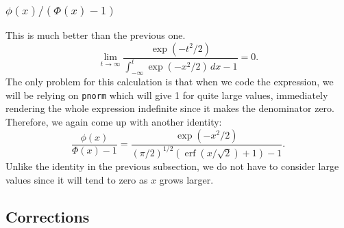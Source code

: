 \documentclass[11pt]{article}
\newcommand{\opn}{\operatorname}
\begin{document}
\subsubsection{$\phi\left(x\right)/\left(\Phi\left(x\right)-1\right)$}
This is much better than the previous one.
\begin{equation*}
  \lim_{t\to\infty} \frac{\exp\left(-t^{2}/2\right)}{\int_{-\infty}^{t} \exp\left(-x^{2}/2\right)\, dx -1} = 0.
\end{equation*}
The only problem for this calculation is that when we code the expression, we will be relying on \texttt{pnorm} which will give 1 for quite large values, immediately rendering the whole expression indefinite since it makes the denominator zero. Therefore, we again come up with another identity:
\begin{equation*}
  \frac{\phi\left(x\right)}{\Phi\left(x\right)-1} = \frac{\exp\left(-x^{2}/2\right)}{\left(\pi/2\right)^{1/2}\left(\opn{erf}\left(x/\sqrt{2}\right)+1\right)-1}.
\end{equation*}
Unlike the identity in the previous subsection, we do not have to consider large values since it will tend to zero as $x$ grows larger.
\subsection{Corrections}
\end{document}
